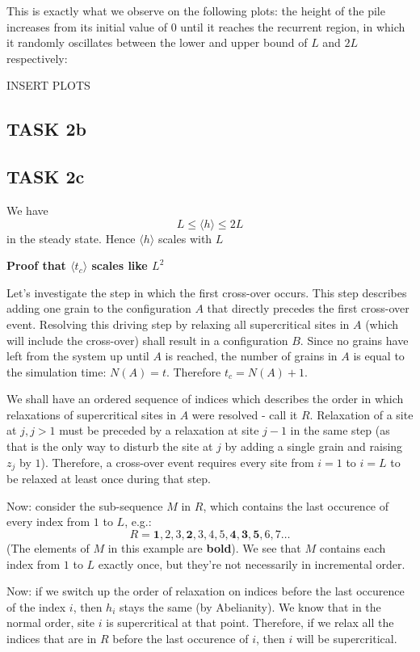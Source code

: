 \documentclass[a4paper,12pt]{article}
\begin{document}
This is exactly what we observe on the following plots: the height of the pile increases from its initial value of $0$ until it reaches the recurrent region, in which it randomly oscillates between the lower and upper bound of $L$ and $2L$ respectively:

INSERT PLOTS

\subsection{TASK 2b}
\subsection{TASK 2c}
We have
$$L \leq \langle h\rangle \leq 2L$$
in the steady state. Hence $\langle h\rangle$ scales with $L$

\textbf{Proof that $\langle t_c\rangle$ scales like $L^2$}

Let's investigate the step in which the first cross-over occurs. This step describes adding one grain to the configuration $A$ that directly precedes the first cross-over event. Resolving this driving step by relaxing all supercritical sites in $A$ (which will include the cross-over) shall result in a configuration $B$. Since no grains have left from the system up until $A$ is reached, the number of grains in $A$ is equal to the simulation time: $N(A)=t$. Therefore $t_c=N(A)+1$.

We shall have an ordered sequence of indices which describes the order in which relaxations of supercritical sites in $A$ were resolved - call it $R$. Relaxation of a site at $j, j>1$ must be preceded by a relaxation at site $j-1$ in the same step (as that is the only way to disturb the site at $j$ by adding a single grain and raising $z_j$ by $1$). Therefore, a cross-over event requires every site from $i=1$ to $i=L$ to be relaxed at least once during that step.

Now: consider the sub-sequence $M$ in $R$, which contains the last occurence of every index from $1$ to $L$, e.g.:
$$R=\mathbf{1}, 2, 3, \mathbf{2}, 3, 4, 5, \mathbf{4}, \mathbf{3}, \mathbf{5}, 6, 7\dots$$
(The elements of $M$ in this example are \textbf{bold}). We see that $M$ contains each index from $1$ to $L$ exactly once, but they're not necessarily in incremental order.

Now: if we switch up the order of relaxation on indices before the last occurence of the index $i$, then $h_i$ stays the same (by Abelianity). We know that in the normal order, site $i$ is supercritical at that point. Therefore, if we relax all the indices that are in $R$ before the last occurence of $i$, then $i$ will be supercritical.
\end{document}
